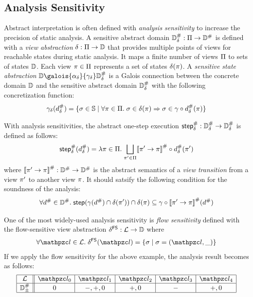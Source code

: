 \subsection{Analysis Sensitivity}

Abstract interpretation is often defined with \textit{analysis sensitivity} to
increase the precision of static analysis.  A sensitive abstract domain
${\mathbb{D}}^{\#}_\delta: \Pi \rightarrow {\mathbb{D}}^{\#}$ is defined with a \textit{view
abstraction} $\delta: \Pi \rightarrow \mathbb{D}$ that provides multiple points
of views for reachable states during static analysis.  It maps a finite number
of views $\Pi$ to sets of states $\mathbb{D}$. Each view $\pi \in \Pi$
represents a set of states $\delta(\pi)$.
A \textit{sensitive state abstraction} $\dom
\galois{\alpha_\viewmap}{\gamma_\viewmap} \sabsdom$ is a Galois connection between
the concrete domain $\mathbb{D}$ and the sensitive abstract domain ${\mathbb{D}}^{\#}_\delta$ with the
following concretization function:
\[
  \gamma_\delta({d}^{\#}_\delta) = \{ \sigma \in \mathbb{S} \mid \forall \pi \in \Pi.
  \; \sigma \in \delta(\pi) \Rightarrow \sigma \in \gamma \circ {d}^{\#}_\delta(\pi) \}
\]

With analysis sensitivities, the abstract one-step execution ${\textsf{step}}^{\#}_\delta:
{\mathbb{D}}^{\#}_\delta \rightarrow {\mathbb{D}}^{\#}_\delta$ is defined as follows:
\[
  {\textsf{step}}^{\#}_\delta({d}^{\#}_\delta) = \lambda \pi \in \Pi. \; \underset{\pi' \in
  \Pi}{\bigsqcup}{{[\![{\pi' \rightarrow \pi}]\!]}^{\#} \circ {d}^{\#}_\delta(\pi')}
\]
where ${[\![{\pi' \rightarrow \pi}]\!]}^{\#}: {\mathbb{D}}^{\#} \rightarrow {\mathbb{D}}^{\#}$ is the abstract
semantics of a \textit{view transition} from a view $\pi'$ to another view
$\pi$.  It should satsify the following condition for the soundness of the
analysis:
\[
  \forall {d}^{\#} \in {\mathbb{D}}^{\#}. \; \textsf{step}(\gamma({d}^{\#}) \cap \delta(\pi'))
  \cap \delta(\pi) \subseteq \gamma \circ
  {[\![{\pi' \rightarrow \pi}]\!]}^{\#}({d}^{\#})
\]

One of the most widely-used analysis sensitivity is \textit{flow sensitivity}
defined with the flow-sensitive view abstraction $\delta^{\textsf{FS}}: \mathcal{L}
\rightarrow \mathbb{D}$ where
\[
  \forall \lab\in\labset. \; \fsviewmap(\lab) = \{ \st \mid \st = (\lab, \_) \}
\]
If we apply the flow sensitivity for the above example, the analysis result
becomes as follows:
\[
  \begin{array}{|c||c|c|c|c|c|}\hline
    \labset & \lab_0 & \lab_1 & \lab_2 & \lab_3 & \lab_4\\\hline
    \absdom_\pm & 0 & -, +, 0 & +, 0 & - & +, 0\\\hline
  \end{array}
\]


